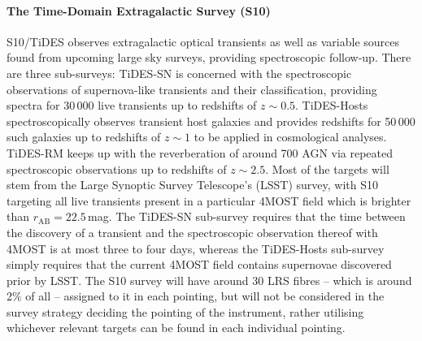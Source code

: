 \documentclass[a4paper,11pt]{article}
\begin{document}
\paragraph{The Time-Domain Extragalactic Survey (S10)}
S10/TiDES \citep{4mosts10} observes extragalactic optical transients as well as variable sources found from upcoming large sky surveys, providing spectroscopic follow-up. There are three sub-surveys: TiDES-SN is concerned with the spectroscopic observations of supernova-like transients and their classification, providing spectra for 30\,000 live transients up to redshifts of $z\sim0.5$. TiDES-Hosts spectroscopically observes transient host galaxies and provides redshifts for 50\,000 such galaxies up to redshifts of $z\sim1$ to be applied in cosmological analyses. TiDES-RM keeps up with the reverberation of around 700 AGN via repeated spectroscopic observations up to redshifts of $z\sim2.5$. Most of the targets will stem from the Large Synoptic Survey Telescope's (LSST) survey, with S10 targeting all live transients present in a particular 4MOST field which is brighter than $r_\mathrm{AB}=22.5$\,mag. The TiDES-SN sub-survey requires that the time between the discovery of a transient and the spectroscopic observation thereof with 4MOST is at most three to four days, whereas the TiDES-Hosts sub-survey simply requires that the current 4MOST field contains supernovae discovered prior by LSST. The S10 survey will have around 30 LRS fibres -- which is around 2\% of all -- assigned to it in each pointing, but will not be considered in the survey strategy deciding the pointing of the instrument, rather utilising whichever relevant targets can be found in each individual pointing.
%
\end{document}
